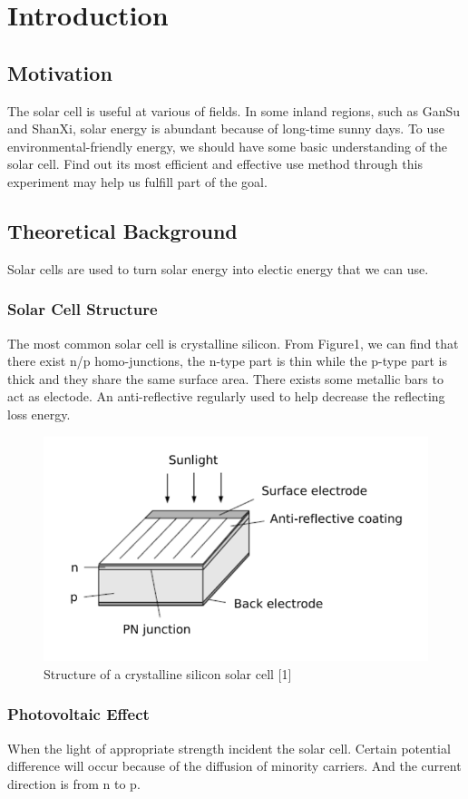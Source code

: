 \documentclass[12pt,a4paper]{article}
\begin{document}
\section{Introduction}
\subsection{Motivation}
The solar cell is useful at various of fields. In some inland regions, such as GanSu and ShanXi, solar energy is abundant because of long-time sunny days. To use environmental-friendly energy, we should have some basic understanding of the solar cell. Find out its most efficient and effective use method through this experiment may help us fulfill part of the goal.

\subsection{Theoretical Background}
Solar cells are used to turn solar energy into electic energy that we can use.

\subsubsection{Solar Cell Structure}
The most common solar cell is crystalline silicon. From Figure1, we can find that there exist n/p homo-junctions, the n-type part is thin while the p-type part is thick and they share the same surface area. There exists some metallic bars to act as electode. An anti-reflective regularly used to help decrease the reflecting loss energy.
\begin{figure}[H]
    \centering
    \includegraphics[width=12cm]{structure.png}
    \caption{Structure of a crystalline silicon solar cell   [1]}
\end{figure}

\subsubsection{Photovoltaic Effect}
When the light of appropriate strength incident the solar cell. Certain potential difference will occur because of the diffusion of minority carriers. And the current direction is from n to p.
\end{document}
